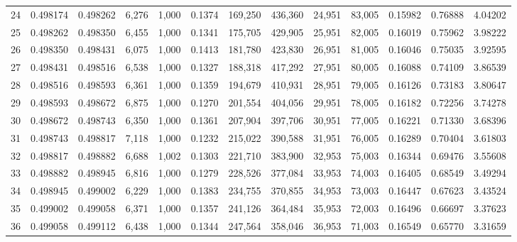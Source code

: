 \begin{tabular}{rrrrrrrrrrrrr}
24  &  0.498174 &  0.498262 &  6,276 &  1,000 &                                     0.1374 &  169,250 &  436,360 &   24,951 &   83,005 &  0.15982 &  0.76888 &  4.04202 \\
25  &  0.498262 &  0.498350 &  6,455 &  1,000 &                                     0.1341 &  175,705 &  429,905 &   25,951 &   82,005 &  0.16019 &  0.75962 &  3.98222 \\
26  &  0.498350 &  0.498431 &  6,075 &  1,000 &                                     0.1413 &  181,780 &  423,830 &   26,951 &   81,005 &  0.16046 &  0.75035 &  3.92595 \\
27  &  0.498431 &  0.498516 &  6,538 &  1,000 &                                     0.1327 &  188,318 &  417,292 &   27,951 &   80,005 &  0.16088 &  0.74109 &  3.86539 \\
28  &  0.498516 &  0.498593 &  6,361 &  1,000 &                                     0.1359 &  194,679 &  410,931 &   28,951 &   79,005 &  0.16126 &  0.73183 &  3.80647 \\
29  &  0.498593 &  0.498672 &  6,875 &  1,000 &                                     0.1270 &  201,554 &  404,056 &   29,951 &   78,005 &  0.16182 &  0.72256 &  3.74278 \\
30  &  0.498672 &  0.498743 &  6,350 &  1,000 &                                     0.1361 &  207,904 &  397,706 &   30,951 &   77,005 &  0.16221 &  0.71330 &  3.68396 \\
31  &  0.498743 &  0.498817 &  7,118 &  1,000 &                                     0.1232 &  215,022 &  390,588 &   31,951 &   76,005 &  0.16289 &  0.70404 &  3.61803 \\
32  &  0.498817 &  0.498882 &  6,688 &  1,002 &                                     0.1303 &  221,710 &  383,900 &   32,953 &   75,003 &  0.16344 &  0.69476 &  3.55608 \\
33  &  0.498882 &  0.498945 &  6,816 &  1,000 &                                     0.1279 &  228,526 &  377,084 &   33,953 &   74,003 &  0.16405 &  0.68549 &  3.49294 \\
34  &  0.498945 &  0.499002 &  6,229 &  1,000 &                                     0.1383 &  234,755 &  370,855 &   34,953 &   73,003 &  0.16447 &  0.67623 &  3.43524 \\
35  &  0.499002 &  0.499058 &  6,371 &  1,000 &                                     0.1357 &  241,126 &  364,484 &   35,953 &   72,003 &  0.16496 &  0.66697 &  3.37623 \\
36  &  0.499058 &  0.499112 &  6,438 &  1,000 &                                     0.1344 &  247,564 &  358,046 &   36,953 &   71,003 &  0.16549 &  0.65770 &  3.31659 \\

\end{tabular}
